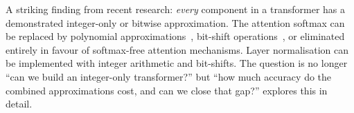 \begin{keyinsight}
A striking finding from recent research: \emph{every} component in
a transformer has a demonstrated integer-only or bitwise
approximation. The attention softmax can be replaced by polynomial
approximations~\cite{kim2021ibert}, bit-shift
operations~\cite{li2022ivit}, or eliminated entirely in favour of
softmax-free attention mechanisms. Layer normalisation can be
implemented with integer arithmetic and bit-shifts. The question is
no longer ``can we build an integer-only transformer?'' but
``how much accuracy do the combined approximations cost, and can
we close that gap?''  explores this in
detail.
\end{keyinsight}


